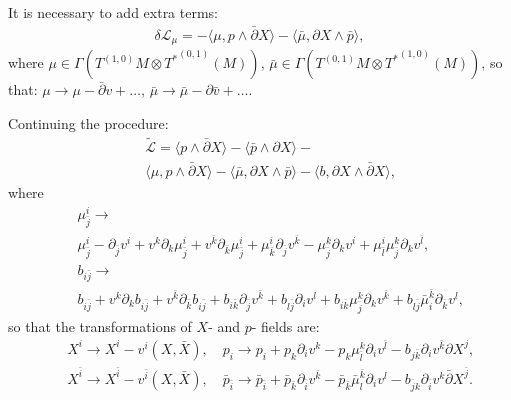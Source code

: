 \documentclass[9pt]{beamer}
\def\b{\bar}
\newcommand{\p}{\partial}
\def\b{\bar}
\begin{document}
\begin{frame}
\frametitle{}
It is necessary to add extra terms:
\begin{eqnarray*}
\delta \mathcal{L}_{\mu}=- \langle \mu, p\wedge \b \p X\rangle -\langle \b \mu, \p X\wedge \b p\rangle,
\end{eqnarray*}
where $\mu\in \Gamma (T^{(1,0)}M\otimes {T^*}^{(0,1)}(M))$, $\bar{\mu}\in \Gamma (T^{(0,1)}M\otimes {T^*}^{(1,0)}(M))$, so that:
$\mu\to \mu-\b \p v+\dots$, $\b \mu\to \b \mu-\p \b v+\dots$.\\

\vspace*{2mm}

Continuing the procedure:
\begin{eqnarray*}
&&\tilde{\mathcal{L}}=
\langle p\wedge\bar{\partial} X\rangle-
\langle \bar{p}\wedge{\partial} X\rangle -\\
&&\langle \mu, p\wedge \b \p X\rangle -\langle \b \mu, \p X\wedge \b p\rangle-\langle b, \p X\wedge \b \p X\rangle,\nonumber
\end{eqnarray*}
where
\begin{eqnarray*}
 &&\mu^{i}_{\bar{j}} \rightarrow \\
 &&\mu^{i}_{\bar{j}} -
\p_{\bar{j}}v^i + v^{k}\p_k\mu^{i}_{\bar{j}} +
v^{\bar{k}}\p_{\bar{k}}\mu^{i}_{\bar{j}}+
\mu^{i}_{\bar{k}}\p_{\bar{j}}v^{\bar{k}} -
\mu^k_{\bar{j}}\p_kv^i
 + \mu^i_{\bar{l}}\mu^k_{\bar{j}}\p_k v^{\bar{l}},\\ 
&&b_{i{\bar j}} \rightarrow \\
&&b_{i{\bar j}} + v^k\p_k b_{i{\bar j}} + v^{\bar{k}}\p_{\bar{k}} b_{i{\bar j}}
+ b_{i{\bar k}}\p_{\bar{j}}v^{\bar{k}}+b_{l{\bar j}}\p_i v^l+b_{i{\bar k}}\mu^{k}_{\bar j}\p_kv^{\bar{k}}
+b_{l{\bar j}}{\bar\mu}^{\bar k}_i\p_{\bar k}v^l,\nonumber
 \end{eqnarray*}
so that the transformations of $X$- and $p$- fields are:
\begin{eqnarray*}
&&X^i\to X^i-v^i(X, \b X), \quad p_{i} \rightarrow p_{i} + p_k \p_iv^k - p_k\mu^k_{\bar{l}}\p_iv^{\bar{l}}
- b_{j{\bar k}}\p_i v^{\bar k}\p X^j,\\
&& X^{\b i}\to X^{\b i}-v^{\b i}(X,\b X), \quad \bar{p}_{\bar{i}} \rightarrow \bar{p}_{\bar{i}} + \bar{p}_{\bar k} \p_{\bar i}v^{\bar {k}} - {\bar p}_{\bar{k}}
{\bar \mu}^{\bar k}_{l}\p_iv^{l}
- b_{\bar{j}k}\p_{\bar{i}} v^{k}\bar{\p} X^{\bar {j}}.\nonumber
\end{eqnarray*}


\end{frame}
\end{document}
